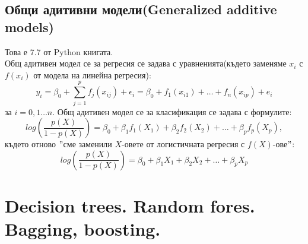 \documentclass{article}
\begin{document}
\subsection{Общи адитивни модели(Generalized additive models)}
Това е 7.7 от Python книгата. \\

Общ адитивен модел се за регресия се задава с уравненията(където заменяме $x_i$ с $f(x_i)$ от модела на линейна регресия):
$$y_i = \beta_0 + \sum_{j=1}^p f_j(x_{ij}) + \epsilon_i = \beta_0 + f_1(x_{i1}) + \dots + f_n(x_{ip}) + e_i $$
за $i = 0,1 \dots n$.
Общ адитивен модел се за класификация се задава с формулите:
$$ log(\frac{p(X)}{1-p(X)}) = \beta_0 + \beta_1 f_1(X_1) + \beta_2 f_2(X_2) + \dots + \beta_p f_p(X_p),$$
където отново $"$сме заменили $X$-овете от логистичната регресия с $f(X)$-ове$"$:
$$ log(\frac{p(X)}{1-p(X)}) = \beta_0 + \beta_1 X_1 + \beta_2 X_2 + \dots + \beta_p X_p $$

	
\newpage	
\section{Decision trees. Random fores. Bagging, boosting.}
	
\newpage
\end{document}
